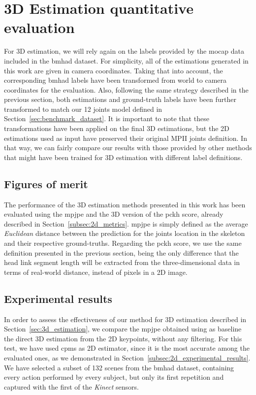 \section{3D Estimation quantitative evaluation}\label{sec:3d_estimation_evaluation}
For 3D estimation, we will rely again on the labels provided by the \gls{mocap} data included in the \gls{bmhad} dataset. For simplicity, all of the estimations generated in this work are given in camera coordinates. Taking that into account, the corresponding \gls{bmhad} labels have been transformed from world to camera coordinates for the evaluation. Also, following the same strategy described in the previous section, both estimations and ground-truth labels have been further transformed to match our 12 joints model defined in Section~\ref{sec:benchmark_dataset}. It is important to note that these transformations have been applied on the final 3D estimations, but the 2D estimations used as input have preserved their original MPII joints definition. In that way, we can fairly compare our results with those provided by other methods that might have been trained for 3D estimation with different label definitions.

\subsection{Figures of merit}
The performance of the 3D estimation methods presented in this work has been evaluated using the \gls{mpjpe} and the 3D version of the \gls{pckh} score, already described in Section~\ref{subsec:2d_metrics}. \gls{mpjpe} is simply defined as the average \emph{Euclidean} distance between the prediction for the joints location  in the skeleton and their respective ground-truths. Regarding the \gls{pckh} score, we use the same definition presented in the previous section, being the only difference that the head link segment length will be extracted from the three-dimensional data in terms of real-world distance, instead of pixels in a 2D image. 

\subsection{Experimental results}
In order to assess the effectiveness of our method for 3D estimation described in Section~\ref{sec:3d_estimation}, we compare the \gls{mpjpe} obtained using as baseline the direct 3D estimation from the 2D keypoints, without any filtering. For this test, we have used \glspl{cpm} as 2D estimator, since it is the most accurate among the evaluated ones, as we demonstrated in Section~\ref{subsec:2d_experimental_results}. We have selected a subset of 132 scenes from the \gls{bmhad} dataset, containing every action performed by every subject, but only its first repetition and captured with the first of the \emph{Kinect} sensors.


